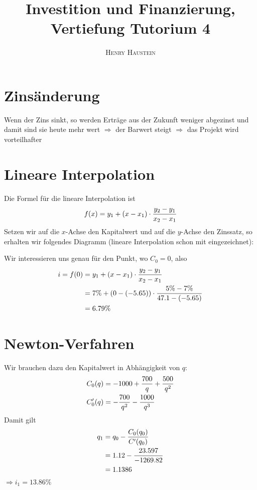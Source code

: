 \documentclass{article}
\title{\textbf{Investition und Finanzierung, Vertiefung Tutorium 4}}
\author{\textsc{Henry Haustein}}
\date{}
\begin{document}
	\maketitle
	
	\section*{Zinsänderung}
	Wenn der Zins sinkt, so werden Erträge aus der Zukunft weniger abgezinst und damit sind sie heute mehr wert $\Rightarrow$ der Barwert steigt $\Rightarrow$ das Projekt wird vorteilhafter

	\section*{Lineare Interpolation}
	Die Formel für die lineare Interpolation ist
	\begin{align}
		f(x) = y_1 + (x - x_1)\cdot\frac{y_2-y_1}{x_2-x_1} \notag
	\end{align}
	Setzen wir auf die $x$-Achse den Kapitalwert und auf die $y$-Achse den Zinssatz, so erhalten wir folgendes Diagramm (lineare Interpolation schon mit eingezeichnet):
	\begin{center}
	\end{center}
	Wir interessieren uns genau für den Punkt, wo $C_0=0$, also
	\begin{align}
		i = f(0) &= y_1 + (x - x_1)\cdot\frac{y_2-y_1}{x_2-x_1} \notag \\
		&= 7\% + (0-(-5.65))\cdot\frac{5\% - 7\%}{47.1 - (-5.65)} \notag \\
		&= 6.79\% \notag
	\end{align}

	\section*{Newton-Verfahren}
	Wir brauchen dazu den Kapitalwert in Abhängigkeit von $q$:
	\begin{align}
		C_0(q) &= -1000 + \frac{700}{q} + \frac{500}{q^2} \notag \\
		C_0'(q) &= -\frac{700}{q^2} - \frac{1000}{q^3} \notag
	\end{align}
	Damit gilt
	\begin{align}
		q_1 &= q_0 - \frac{C_0(q_0)}{C'(q_0)} \notag \\
		&= 1.12 - \frac{23.597}{-1269.82} \notag \\
		&= 1.1386 \notag
	\end{align}
	$\Rightarrow i_1 = 13.86\%$
	
\end{document}
